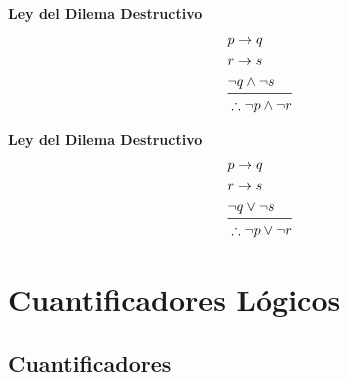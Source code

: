 \documentclass[12pt, fleqn]{report}                             %
\theoremstyle{break}                                            %
\begin{document}
            \begin{multicols}{2}
                
                \large{\textbf{Ley del Dilema Destructivo}}
                    \begin{equation*}
                    \begin{split}
                        &p \to q                \\
                        &r \to s                \\
                        &\lnot q \land \lnot s  \\
                        \midrule
                        &\therefore \lnot p \land \lnot r
                    \end{split}
                    \end{equation*}

                \large{\textbf{Ley del Dilema Destructivo}}
                    \begin{equation*}
                    \begin{split}
                        &p \to q                \\
                        &r \to s                \\
                        &\lnot q \lor \lnot s   \\
                        \midrule
                        &\therefore \lnot p \lor \lnot r
                    \end{split}
                    \end{equation*}

            \end{multicols}




    \clearpage
    \chapter{Cuantificadores Lógicos}
        \clearpage

        \clearpage
        \section{Cuantificadores}
\end{document}
